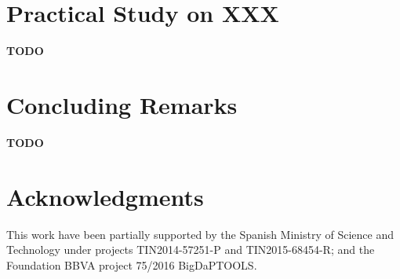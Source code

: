 \documentclass[3p,review]{elsarticle}
\newcommand{\TODO}{\textbf{TODO}}
\begin{document}

\section{Practical Study on XXX}\label{sec:exp}

\TODO



\section{Concluding Remarks}\label{sec:conclusions}

\TODO

\section*{Acknowledgments}\label{sec:ack}

This work have been partially supported by the Spanish Ministry of Science and Technology under projects TIN2014-57251-P and TIN2015-68454-R; and the Foundation BBVA project 75/2016 BigDaPTOOLS.




\end{document}
